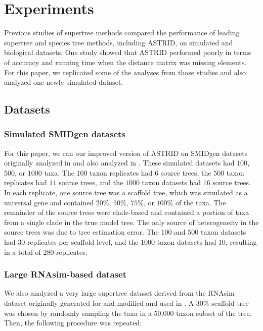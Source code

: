 \section{Experiments}

Previous studies of supertree methods \cite{fastrfs,smidgen} compared the performance of leading supertree and species tree methods, including ASTRID, on simulated and biological datasets. 
One study \cite{fastrfs} showed that ASTRID performed poorly in terms of accuracy and running time when the distance matrix was missing elements. For this paper, we replicated some of the analyses from those studies and also analyzed one newly simulated dataset.

\subsection{Datasets}

\subsubsection{Simulated SMIDgen datasets}
For this paper, we ran our improved version of ASTRID on SMIDgen datasets originally analyzed in \cite{smidgen} and also analyzed in \cite{fastrfs}. These simulated datasets had $100$, $500$, or $1000$ taxa. The $100$ taxon replicates had $6$ source trees, the $500$ taxon replicates had $11$ source trees, and the $1000$ taxon datasets had $16$ source trees. In each replicate, one source tree was a scaffold tree, which was simulated as a universal gene and contained $20\%$, $50\%$, $75\%$, or $100\%$ of the taxa. The remainder of the source trees were clade-based and contained a portion of taxa from a single clade in the true model tree. The only source of heterogeneity in the source trees was due to tree estimation error. The $100$ and $500$ taxon datasets had 30 replicates per scaffold level, and the $1000$ taxon datasets had 10, resulting in a total of $280$ replicates.

\subsubsection{Large RNAsim-based dataset}
We also analyzed a very large supertree dataset derived from the RNAsim dataset originally generated for \cite{nam2015ultra} and modified and used in \cite{mirarab2015pasta}. A 30\% scaffold tree was chosen by randomly sampling the taxa in a 50,000 taxon subset of the tree. Then, the following procedure was repeated: 

